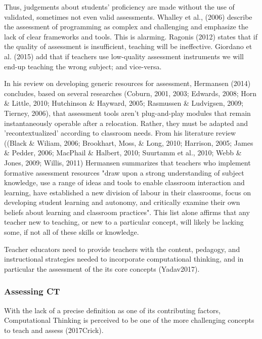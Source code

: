 Thus, judgements about students' proficiency are made without the use of validated, sometimes not even valid assessments. Whalley et al., (2006) describe the assessment of programming as complex and challenging and emphasize the lack of clear frameworks and tools. This is alarming. Ragonis (2012) states that if the quality of assessment is insufficient, teaching will be ineffective.  Giordano et al. (2015) add that if teachers use low-quality assessment instruments we will end-up teaching the wrong subject; and vice-versa.





In his review on developing generic resources for assessment, Hermansen (2014) concludes, based on several researches (Coburn, 2001, 2003; Edwards, 2008; Horn \& Little, 2010; Hutchinson \& Hayward, 2005; Rasmussen \& Ludvigsen, 2009; Tierney, 2006), that assessment tools aren't plug-and-play modules that remain instantaneously operable after a relocation. Rather, they must be adapted  and 'recontextualized' according to classroom needs. From his literature review ((Black \& Wiliam, 2006; Brookhart, Moss, \& Long, 2010; Harrison, 2005; James \& Pedder, 2006; MacPhail \& Halbert, 2010; Suurtamm et al., 2010; Webb \& Jones, 2009; Willis, 2011) Hermansen summarizes that teachers who implement formative assessment resources "draw upon a strong understanding of subject knowledge, use a range of ideas and tools to enable classroom interaction and learning, have established a new division of labour in their classrooms, focus on developing student learning and autonomy, and critically examine their own beliefs about learning and classroom practices". This list alone affirms that any teacher new to teaching, or new to a particular concept, will likely be lacking some, if not all of these skills or knowledge.


Teacher educators need to provide teachers with the content, pedagogy, and instructional strategies needed to incorporate computational thinking, and in particular the assessment of the its core concepts (Yadav2017).



\subsubsection*{Assessing CT}
With the lack of a precise definition as one of its contributing factors, Computational Thinking is perceived to be one of the more challenging concepts to teach and assess (2017Crick).

